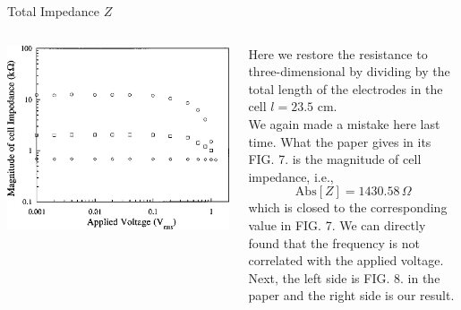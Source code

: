\documentclass[11pt]{beamer}
\begin{document}
\begin{frame}{Total Impedance $Z$}
    \begin{columns}[onlytextwidth]
        \begin{column}{0.35\textwidth}
            \includegraphics[width=\columnwidth]{6.jpg}
        \end{column}
        \begin{column}{0.6\textwidth}
            Here we restore the resistance to three-dimensional by dividing by the total length of the electrodes in the cell $l=23.5$ cm.\\
            We again made a mistake here last time. What the paper gives in its FIG. 7. is the magnitude of cell impedance, i.e.,
            \[\mathrm{Abs}[Z]=1430.58\,\Omega\]
            which is closed to the corresponding value in FIG. 7.
            We can directly found that the frequency is not correlated with the applied voltage.\\
            Next, the left side is FIG. 8. in the paper and the right side is our result.
        \end{column}
    \end{columns}
\end{frame}
\end{document}
